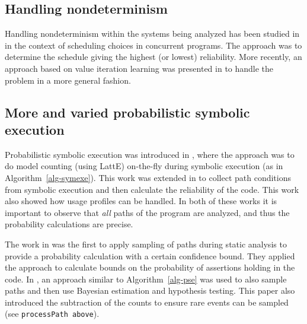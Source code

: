 
\subsection{Handling nondeterminism}

Handling nondeterminism within the systems being analyzed has been studied in \cite{Filieri2013} in the context of scheduling choices in concurrent programs. The approach was to determine the schedule giving the highest (or lowest) reliability. More recently, an approach based on value iteration learning was presented in \cite{luckow2014exact} to handle the problem in a more general fashion.

\subsection{More and varied probabilistic symbolic execution}

Probabilistic symbolic execution was introduced in \cite{Geldenhuys2012}, where the approach was to do model counting (using LattE) on-the-fly during symbolic execution (as in Algorithm~\ref{alg-symexe}). This work was extended in \cite{Filieri2013} to collect path conditions from symbolic execution and then calculate the reliability of the code. This work also showed how usage profiles can be handled. In both of these works it is important to observe that {\it all} paths of the program are analyzed, and thus the probability calculations are precise. 

The work in \cite{Sankaranarayanan2013} was the first to apply sampling of paths during static analysis to provide a probability calculation with a certain confidence bound. They applied the approach to calculate bounds on the probability of assertions holding in the code. In \cite{filieri2014statistical}, an approach similar to Algorithm~\ref{alg-pse} was used to also sample paths and then use Bayesian estimation and hypothesis testing. This paper also introduced the subtraction of the counts to ensure rare events can be sampled (see {\tt processPath above}). 


